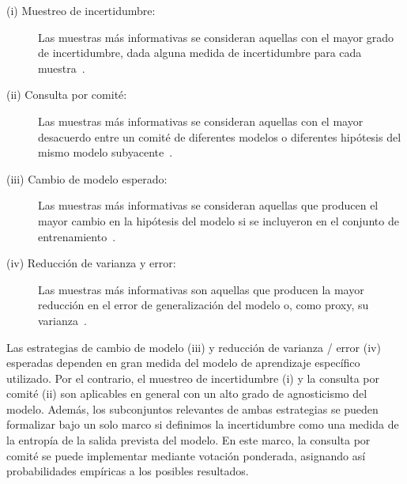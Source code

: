 \begin{description}
  \item [(i) Muestreo de incertidumbre:] Las muestras más informativas se consideran aquellas con el mayor grado de incertidumbre, dada alguna medida de incertidumbre para cada muestra~\cite{Lewis1994148}.

  \item [(ii) Consulta por comité:] Las muestras más informativas se consideran aquellas con el mayor desacuerdo entre un comité de diferentes modelos o diferentes hipótesis del mismo modelo subyacente~\cite{seungquery}.

  \item [(iii) Cambio de modelo esperado:] Las muestras más informativas se consideran aquellas que producen el mayor cambio en la hipótesis del modelo si se incluyeron en el conjunto de entrenamiento~\cite{NIPS2007_3252}.

  \item [(iv) Reducción de varianza y error:] Las muestras más informativas son aquellas que producen la mayor reducción en el error de generalización del modelo o, como proxy, su varianza~\cite{roy2001toward}.
\end{description}

Las estrategias de cambio de modelo (iii) y reducción de varianza / error (iv) esperadas dependen en gran medida del modelo de aprendizaje específico utilizado.
Por el contrario, el muestreo de incertidumbre (i) y la consulta por comité (ii) son aplicables en general con un alto grado de agnosticismo del modelo.
Además, los subconjuntos relevantes de ambas estrategias se pueden formalizar bajo un solo marco si definimos la incertidumbre como una medida de la entropía de la salida prevista del modelo.
En este marco, la consulta por comité se puede implementar mediante votación ponderada, asignando así probabilidades empíricas a los posibles resultados.

